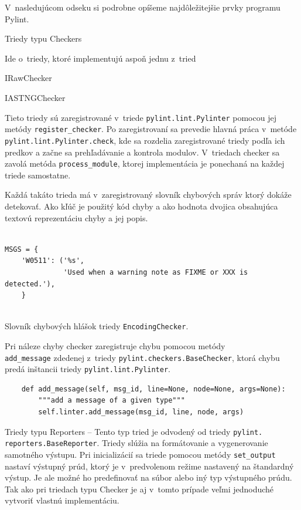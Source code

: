 \documentclass[11pt,oneside,final]{fithesis2}
\begin{document}
		V~nasledujúcom odseku si podrobne opíšeme najdôležitejšie prvky programu Pylint.
		
    \begin{list}{•}{}
		\item Triedy typu Checkers 
		
		Ide o~triedy, ktoré implementujú aspoň jednu z~tried
		
			    \begin{list}{•}{}
					\item IRawChecker
					\item IASTNGChecker
    			\end{list}		
		
		Tieto triedy sú zaregistrované v~triede \texttt{pylint.lint.Pylinter} pomocou jej metódy \texttt{register\_checker}.	Po zaregistrovaní sa prevedie hlavná práca v~metóde \texttt{pylint.lint.Pylinter.check}, kde sa rozdelia zaregistrované triedy podľa ich predkov a začne sa prehľadávanie a kontrola modulov. V~triedach checker sa zavolá metóda \texttt{process\_module}, ktorej implementácia je ponechaná na každej triede samostatne.
		
		Každá takáto trieda má v~zaregistrovaný slovník chybových správ ktorý dokáže detekovať. Ako kľúč je použitý kód chyby a ako hodnota dvojica obsahujúca textovú reprezentáciu chyby a jej popis.

\begin{lstlisting}

MSGS = {
    'W0511': ('%s',
              'Used when a warning note as FIXME or XXX is detected.'),
    }
		
\end{lstlisting}		

Slovník chybových hlášok triedy \texttt{EncodingChecker}.


Pri náleze chyby checker zaregistruje chybu pomocou metódy \\\texttt{add\_message} zdedenej z~triedy \texttt{pylint.checkers.BaseChecker}, ktorá chybu predá inštancii triedy \texttt{pylint.lint.Pylinter}.

\begin{lstlisting}
    def add_message(self, msg_id, line=None, node=None, args=None):
        """add a message of a given type"""
        self.linter.add_message(msg_id, line, node, args)
\end{lstlisting}

	
		\item Triedy typu Reporters -- 
		Tento typ tried je odvodený od triedy \texttt{pylint.\\reporters.BaseReporter}. Triedy slúžia na formátovanie a vygenerovanie samotného výstupu. Pri inicializácií sa triede pomocou metódy \texttt{set\_output} nastaví výstupný prúd, ktorý je v~predvolenom režime nastavený na štandardný výstup. Je ale možné ho predefinovať na súbor alebo iný typ výstupného prúdu. Tak ako pri triedach typu Checker je aj v~tomto prípade veľmi jednoduché vytvoriť vlastnú implementáciu.
		

\end{list}
\end{document}
